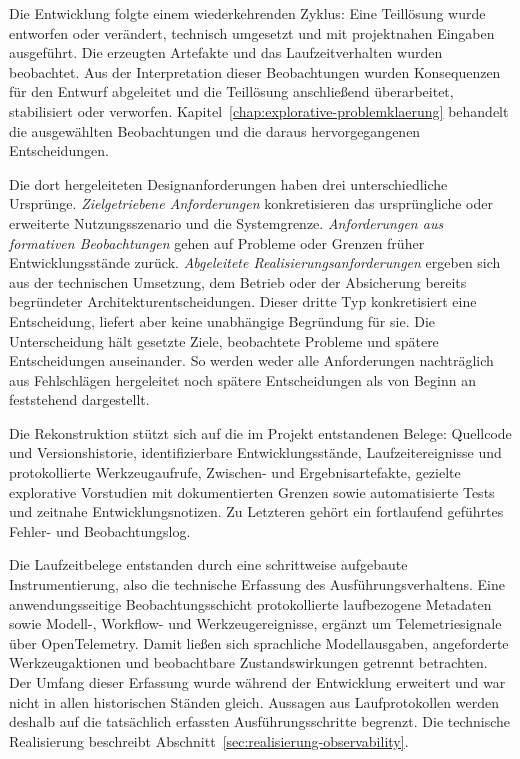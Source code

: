 Die Entwicklung folgte einem wiederkehrenden Zyklus: Eine Teillösung
wurde entworfen oder verändert, technisch umgesetzt und mit
projektnahen Eingaben ausgeführt. Die erzeugten Artefakte und das
Laufzeitverhalten wurden beobachtet. Aus der Interpretation dieser
Beobachtungen wurden Konsequenzen für den Entwurf abgeleitet und die
Teillösung anschließend überarbeitet, stabilisiert oder verworfen.
Kapitel~\ref{chap:explorative-problemklaerung} behandelt die ausgewählten
Beobachtungen und die daraus hervorgegangenen Entscheidungen.

Die dort hergeleiteten Designanforderungen haben drei unterschiedliche
Ursprünge. \emph{Zielgetriebene Anforderungen} konkretisieren das
ursprüngliche oder erweiterte Nutzungsszenario und die Systemgrenze.
\emph{Anforderungen aus formativen Beobachtungen} gehen auf Probleme
oder Grenzen früher Entwicklungsstände zurück.
\emph{Abgeleitete Realisierungsanforderungen} ergeben sich aus der
technischen Umsetzung, dem Betrieb oder der Absicherung bereits
begründeter Architekturentscheidungen. Dieser dritte Typ konkretisiert
eine Entscheidung, liefert aber keine unabhängige Begründung für sie.
Die Unterscheidung hält gesetzte Ziele, beobachtete Probleme und
spätere Entscheidungen auseinander. So werden weder alle Anforderungen
nachträglich aus Fehlschlägen hergeleitet noch spätere Entscheidungen
als von Beginn an feststehend dargestellt.

Die Rekonstruktion stützt sich auf die im Projekt entstandenen Belege:
Quellcode und Versionshistorie, identifizierbare Entwicklungsstände,
Laufzeitereignisse und protokollierte Werkzeugaufrufe, Zwischen- und
Ergebnisartefakte, gezielte explorative Vorstudien mit dokumentierten
Grenzen sowie automatisierte Tests und zeitnahe Entwicklungsnotizen.
Zu Letzteren gehört ein fortlaufend geführtes Fehler- und
Beobachtungslog.

Die Laufzeitbelege entstanden durch eine schrittweise aufgebaute
Instrumentierung, also die technische Erfassung des
Ausführungsverhaltens. Eine anwendungsseitige Beobachtungsschicht
protokollierte laufbezogene Metadaten sowie Modell-, Workflow- und
Werkzeugereignisse, ergänzt um Telemetriesignale über OpenTelemetry.
Damit ließen sich sprachliche Modellausgaben, angeforderte
Werkzeugaktionen und beobachtbare Zustandswirkungen getrennt
betrachten. Der Umfang dieser Erfassung wurde während der Entwicklung
erweitert und war nicht in allen historischen Ständen gleich.
Aussagen aus Laufprotokollen werden deshalb auf die tatsächlich
erfassten Ausführungsschritte begrenzt. Die technische Realisierung
beschreibt Abschnitt~\ref{sec:realisierung-observability}.

